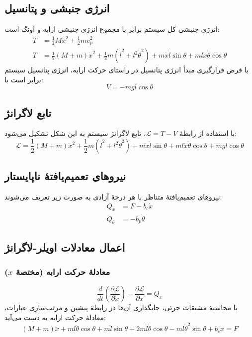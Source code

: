 \subsection{انرژی جنبشی و پتانسیل}

انرژی جنبشی کل سیستم برابر با مجموع انرژی جنبشی ارابه و آونگ است:
\begin{align*}
    T & = \frac{1}{2}M\dot{x}^2 + \frac{1}{2}m v_p^2                                                                                                          \\
    T & = \frac{1}{2}(M+m)\dot{x}^2 + \frac{1}{2}m \left( \dot{l}^2 + l^2\dot{\theta}^2 \right) + m\dot{x}\dot{l}\sin\theta + ml\dot{x}\dot{\theta}\cos\theta
\end{align*}
با فرض قرارگیری مبدأ انرژی پتانسیل در راستای حرکت ارابه، انرژی پتانسیل سیستم برابر است با:
\[
    V = -mgl\cos\theta
\]

\subsection{تابع لاگرانژ}

با استفاده از رابطهٔ $\mathcal{L} = T - V$، تابع لاگرانژ سیستم به این شکل تشکیل می‌شود:
\[
    \mathcal{L} = \frac{1}{2}(M+m)\dot{x}^2 + \frac{1}{2}m(\dot{l}^2 + l^2\dot{\theta}^2) + m\dot{x}\dot{l}\sin\theta + ml\dot{x}\dot{\theta}\cos\theta + mgl\cos\theta
\]

\subsection{نیروهای تعمیم‌یافتهٔ ناپایستار}
نیروهای تعمیم‌یافتهٔ متناظر با هر درجهٔ آزادی به صورت زیر تعریف می‌شوند:
\begin{align*}
    Q_x      & = F - b_c\dot{x}   \\
    Q_\theta & = -b_p\dot{\theta}
\end{align*}

\subsection{اعمال معادلات اویلر-لاگرانژ}

\subsubsection{معادلهٔ حرکت ارابه (مختصهٔ $x$)}
\[
    \frac{d}{dt}\left(\frac{\partial \mathcal{L}}{\partial \dot{x}}\right) - \frac{\partial \mathcal{L}}{\partial x} = Q_x
\]
با محاسبهٔ مشتقات جزئی، جایگذاری آن‌ها در رابطهٔ پیشین و مرتب‌سازی عبارات، معادلهٔ حرکت ارابه به دست می‌آید:
\[
    (M+m)\ddot{x} + ml\ddot{\theta}\cos\theta + m\ddot{l}\sin\theta + 2m\dot{l}\dot{\theta}\cos\theta - ml\dot{\theta}^2\sin\theta + b_c\dot{x} = F
\]

